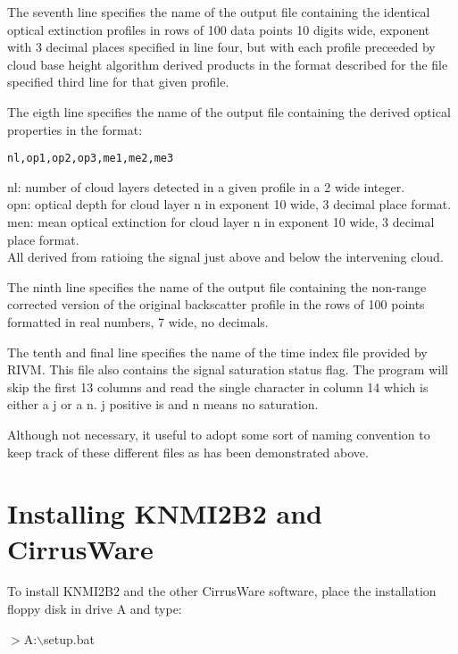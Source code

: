 The seventh line specifies the name of the output file containing the
identical optical extinction profiles in rows of 100 data points 10 digits
wide, exponent with 3 decimal places specified in line four, but with 
each profile preceeded by cloud base height algorithm \cite{srpwsaic}
derived products in the
format described for the file specified third line for that given
profile.

The eigth line specifies the name of the output file containing the
derived optical properties in the format:

\begin{center}
	{\tt nl,op1,op2,op3,me1,me2,me3}
\end{center}
\noindent
nl: number of cloud layers detected in a given profile in a 2 wide integer.\\
opn: optical depth for cloud layer n in exponent 
     10 wide, 3 decimal place format.\\
men: mean optical extinction for cloud layer n in exponent 
     10 wide, 3 decimal place format.\\

All derived from ratioing the signal just above and below the
intervening cloud.

The ninth line specifies the name of the output file 
containing the non-range corrected version of the original backscatter
profile in the rows of 100 points formatted in real numbers, 
7 wide, no decimals.

The tenth and final line specifies the name of the time index file 
provided by RIVM. This file also contains the signal saturation
status flag. The program will skip the first 13 columns and read
the single character in column 14 which is either a j or a n.
j positive is and n means no saturation.

Although not necessary, it useful to adopt some sort of naming
convention to keep track of these different files as has been
demonstrated above.

\section{Installing KNMI2B2 and CirrusWare}

To install KNMI2B2 and the other CirrusWare software,
place the installation floppy disk in drive A
and type:

\begin{center}
	$>$A:$\backslash$setup.bat
\end{center}

